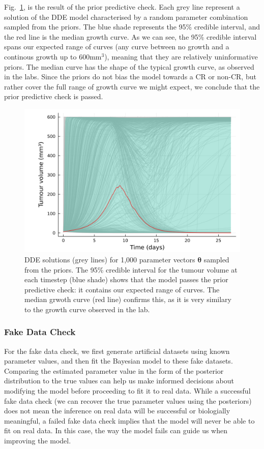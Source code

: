 \documentclass[11pt]{article}
\begin{document}
Fig.~\ref{fig:ppc_1}, is the result of the prior predictive check. Each grey line represent a solution of the DDE model characterised by a random parameter combination sampled from the priors. The blue shade represents the 95\% credible interval, and the red line is the median growth curve. As we can see, the 95\% credible interval spans our expected range of curves (any curve between no growth and a continous growth up to 600mm$^3$), meaning that they are relatively uninformative priors. The median curve has the shape of the typical growth curve, as observed in the labs. Since the priors do not bias the model towards a CR or non-CR, but rather cover the full range of growth curve we might expect, we conclude that the prior predictive check is passed.
    \begin{figure}[!ht]
        \centering\includegraphics[scale=0.7]{LOGprout.png}
        \caption{DDE solutions (grey lines) for 1,000 parameter vectors $\boldsymbol{\theta}$ sampled from the priors. The 95\% credible interval for the tumour volume at each timestep (blue shade) shows that the model passes the prior predictive check: it contains our expected range of curves. The median grwoth curve (red line) confirms this, as it is very similary to the growth curve observed in the lab.}
        \label{fig:ppc_1}
    \end{figure}


\subsubsection{Fake Data Check}
For the fake data check, we first generate artificial datasets using known parameter values, and then fit the Bayesian model to these fake datasets. Comparing the estimated parameter value in the form of the posterior distribution to the true values can help us make informed decisions about modifying the model before proceeding to fit it to real data. While a successful fake data check (we can recover the true parameter values using the posteriors) does not mean the inference on real data will be successful or biologially meaningful, a failed fake data check implies that the model will never be able to fit on real data. In this case, the way the model fails can guide us when improving the model.
\end{document}
